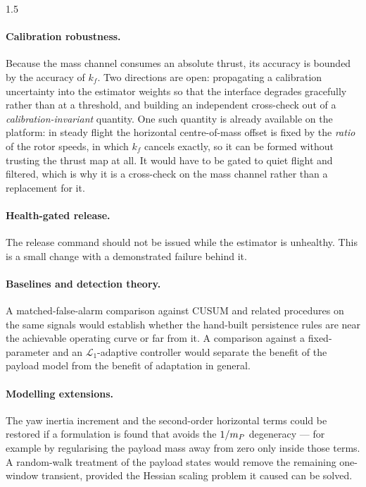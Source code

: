 \begin{spacing}{1.5}
\paragraph{Calibration robustness.} Because the mass channel consumes an absolute
thrust, its accuracy is bounded by the accuracy of $k_f$. Two directions are
open: propagating a calibration uncertainty into the estimator weights so that
the interface degrades gracefully rather than at a threshold, and building an
independent cross-check out of a \emph{calibration-invariant} quantity. One such
quantity is already available on the platform: in steady flight the horizontal
centre-of-mass offset is fixed by the \emph{ratio} of the rotor speeds, in which
$k_f$ cancels exactly, so it can be formed without trusting the thrust map at
all. It would have to be gated to quiet flight and filtered, which is why it is a
cross-check on the mass channel rather than a replacement for it.

\paragraph{Health-gated release.} The release command should not be issued while
the estimator is unhealthy. This is a small change with a demonstrated failure
behind it.

\paragraph{Baselines and detection theory.} A matched-false-alarm comparison
against CUSUM and related procedures on the same signals would establish whether
the hand-built persistence rules are near the achievable operating curve or far
from it. A comparison against a fixed-parameter and an $\mathcal{L}_1$-adaptive
controller would separate the benefit of the payload model from the benefit of
adaptation in general.

\paragraph{Modelling extensions.} The yaw inertia increment and the second-order
horizontal terms could be restored if a formulation is found that avoids the
$1/m_P$ degeneracy --- for example by regularising the payload mass away from
zero only inside those terms. A random-walk treatment of the payload states would
remove the remaining one-window transient, provided the Hessian scaling problem
it caused can be solved.


\end{spacing}
